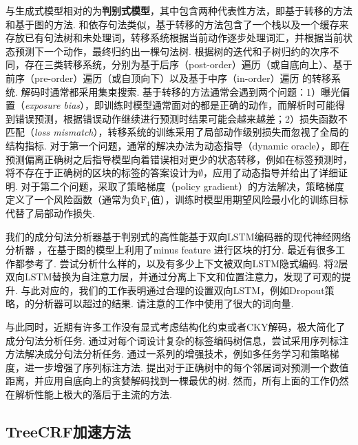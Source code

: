 与生成式模型相对的为\textbf{判别式模型}，其中包含两种代表性方法，即基于转移的方法和基于图的方法.
和依存句法类似，基于转移的方法包含了一个栈以及一个缓存来存放已有句法树和未处理词，转移系统根据当前动作逐步处理词汇，并根据当前状态预测下一个动作，最终归约出一棵句法树.
根据树的迭代和子树归约的次序不同，存在三类转移系统，分别为基于后序（post-order）遍历（或自底向上）、基于前序（pre-order）遍历（或自顶向下）以及基于中序（in-order）遍历 \citep{liu-zhang-2017-order}的转移系统.
解码时通常都采用集束搜索.
基于转移的方法通常会遇到两个问题：1）曝光偏置（\emph{exposure bias}），即训练时模型通常面对的都是正确的动作，而解析时可能得到错误预测，根据错误动作继续进行预测时结果可能会越来越差；2）损失函数不匹配（\emph{loss mismatch}），转移系统的训练采用了局部动作级别损失而忽视了全局的结构指标.
对于第一个问题，通常的解决办法为动态指导（dynamic oracle），即在预测偏离正确树之后指导模型向着错误相对更少的状态转移，例如在标签预测时，将不存在于正确树的区块的标签的答案设计为$\emptyset$，\citet{cross-huang-2016-span}应用了动态指导并给出了详细证明.
对于第二个问题，\citet{fried-klein-2018-policy}采取了策略梯度（policy gradient）的方法解决，策略梯度定义了一个风险函数（通常为负$\mathrm{F}_1$值），训练时模型用期望风险最小化的训练目标代替了局部动作损失.

我们的成分句法分析器基于判别式的高性能基于双向LSTM编码器的现代神经网络分析器 \citep{stern-etal-2017-minimal}，在基于图的模型上利用了minus feature \citep{cross-huang-2016-span}进行区块的打分.
最近有很多工作都参考了\citet{stern-etal-2017-minimal}.
\citet{gaddy-etal-2018-whats}尝试分析什么样的，以及有多少上下文被双向LSTM隐式编码.
\citet{kitaev-klein-2018-constituency}将2层双向LSTM替换为自注意力层，并通过分离上下文和位置注意力，发现了可观的提升.
与此对应的，我们的工作表明通过合理的设置双向LSTM，例如Dropout策略，\citet{stern-etal-2017-minimal}的分析器可以超过\citet{kitaev-klein-2018-constituency}的结果.
请注意\citet{kitaev-klein-2018-constituency}的工作中使用了很大的词向量.

与此同时，近期有许多工作没有显式考虑结构化约束或者CKY解码，极大简化了成分句法分析任务.
\citet{gomez-rodriguez-vilares-2018-constituent}通过对每个词设计复杂的标签编码树信息，尝试采用序列标注方法解决成分句法分析任务.
\citet{vilares-etal-2019-better}通过一系列的增强技术，例如多任务学习和策略梯度，进一步增强了序列标注方法.
\citet{shen-etal-2018-straight}提出对于正确树中的每个邻居词对预测一个数值距离，并应用自底向上的贪婪解码找到一棵最优的树.
然而，所有上面的工作仍然在解析性能上极大的落后于主流的方法.

\subsection{TreeCRF加速方法}

